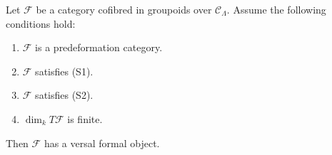 %
\begin{lemma}
\label{lemma-versal-object-existence}
Let $\mathcal{F}$ be a category cofibred in groupoids over
$\mathcal{C}_\Lambda$. Assume the following conditions hold:
\begin{enumerate}
\item $\mathcal{F}$ is a predeformation category.
\item $\mathcal{F}$ satisfies (S1).
\item $\mathcal{F}$ satisfies (S2).
\item $\dim_k T\mathcal{F}$ is finite.
\end{enumerate}
Then $\mathcal{F}$ has a versal formal object.
\end{lemma}

